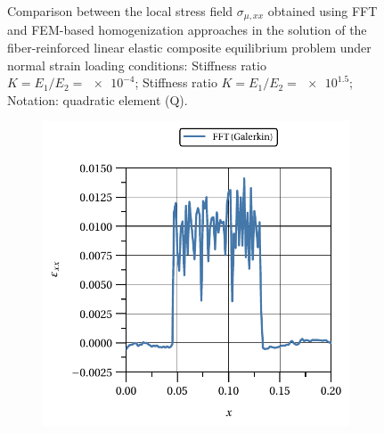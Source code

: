 \begin{figure}[hbt]
\begin{subfigure}[b]{\textwidth}
    \caption{}
    \label{subfig:linear_2D_ratio_-4_normal_stress_11}
  \end{subfigure}
  \caption{Comparison between the local stress field \(\sigma_{\mu,xx}\) obtained using
  FFT and FEM-based homogenization approaches in the solution of the fiber-reinforced
  linear elastic composite equilibrium problem under normal strain loading conditions:
   Stiffness ratio \(K=E_1/E_2=\num{e-4}\);
   Stiffness ratio \(K=E_1/E_2=\num{e1.5}\);
  Notation: quadratic element (Q).}
\label{fig:linear_2D_stiff_contrast_normal_stress_11}
\end{figure}

\begin{figure}[hbt]
  \centering
  	\begin{subfigure}[b]{0.49\textwidth}
      \centering
      \includegraphics[width=\textwidth]{figures/linear_2D_ratio_-4_normal_strain_11_particle_1}
      \caption{}
      \label{subfig:linear_2D_ratio_-4_normal_strain_11_particle_1}
    \end{subfigure}
    \begin{subfigure}[b]{0.49\textwidth}
      \centering

\end{subfigure}
\end{figure}
